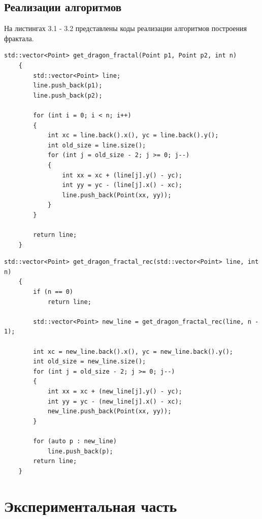 \documentclass[12pt, a4paper]{report}
\begin{document}
	\section{Реализации алгоритмов}
	На листингах 3.1 - 3.2 представлены коды реализации алгоритмов построения фрактала.
	\begin{lstlisting}[label=some-code,caption=Итерационная реализация]
	std::vector<Point> get_dragon_fractal(Point p1, Point p2, int n)
	{
		std::vector<Point> line;
		line.push_back(p1);
		line.push_back(p2);
	
		for (int i = 0; i < n; i++)
		{
			int xc = line.back().x(), yc = line.back().y();
			int old_size = line.size();
			for (int j = old_size - 2; j >= 0; j--)
			{
				int xx = xc + (line[j].y() - yc);
				int yy = yc - (line[j].x() - xc);
				line.push_back(Point(xx, yy));
			}
		}
	
		return line;
	}
	\end{lstlisting}

	\begin{lstlisting}[label=some-code,caption=Рекурсивная реализация]
	std::vector<Point> get_dragon_fractal_rec(std::vector<Point> line, int n)
	{
		if (n == 0)
			return line;
	
		std::vector<Point> new_line = get_dragon_fractal_rec(line, n - 1);
	
		int xc = new_line.back().x(), yc = new_line.back().y();
		int old_size = new_line.size();
		for (int j = old_size - 2; j >= 0; j--)
		{
			int xx = xc + (new_line[j].y() - yc);
			int yy = yc - (new_line[j].x() - xc);
			new_line.push_back(Point(xx, yy));
		}
	
		for (auto p : new_line)
			line.push_back(p);
		return line;
	}
	\end{lstlisting}

	\newpage


	\chapter{Экспериментальная часть}
\end{document}
